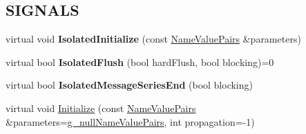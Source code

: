 \subsection*{SIGNALS}
\label{_amgrpe8aec3b875fcfac29de4bc603e426577}
 \begin{DoxyCompactItemize}
\item 
\hypertarget{class_buffered_transformation_a7bb05ac3b6302e2ab994586d526fa804}{
virtual void {\bfseries IsolatedInitialize} (const \hyperlink{class_name_value_pairs}{NameValuePairs} \&parameters)}
\label{class_buffered_transformation_a7bb05ac3b6302e2ab994586d526fa804}

\item 
\hypertarget{class_buffered_transformation_a68044dc8d57bc02edee1ce02b459a63d}{
virtual bool {\bfseries IsolatedFlush} (bool hardFlush, bool blocking)=0}
\label{class_buffered_transformation_a68044dc8d57bc02edee1ce02b459a63d}

\item 
\hypertarget{class_buffered_transformation_aaf09f0cd6dbd022539a9ac5c316d4984}{
virtual bool {\bfseries IsolatedMessageSeriesEnd} (bool blocking)}
\label{class_buffered_transformation_aaf09f0cd6dbd022539a9ac5c316d4984}

\item 
\hypertarget{class_buffered_transformation_a102734fc6fd234382ef601f4b5221aff}{
virtual void \hyperlink{class_buffered_transformation_a102734fc6fd234382ef601f4b5221aff}{Initialize} (const \hyperlink{class_name_value_pairs}{NameValuePairs} \&parameters=\hyperlink{cryptlib_8h_ab1b0f7d11a21c6163be8ca2662ce2ac6}{g\_\-nullNameValuePairs}, int propagation=-\/1)}
\label{class_buffered_transformation_a102734fc6fd234382ef601f4b5221aff}


\end{DoxyCompactItemize}
